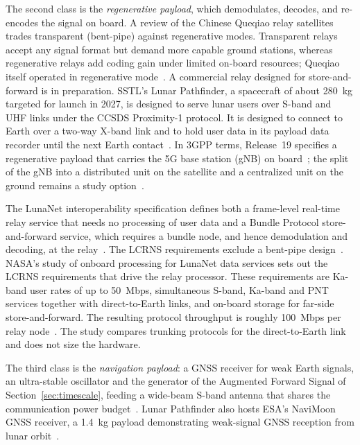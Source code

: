 \documentclass{IEEEoj}
\begin{document}
The second class is the \emph{regenerative payload}, which demodulates, decodes, and re-encodes the signal on board. A review of the Chinese Queqiao relay satellites trades transparent (bent-pipe) against regenerative modes. Transparent relays accept any signal format but demand more capable ground stations, whereas regenerative relays add coding gain under limited on-board resources; Queqiao itself operated in regenerative mode~\cite{queqiao_relay_review_2021}. A commercial relay designed for store-and-forward is in preparation. SSTL's Lunar Pathfinder, a spacecraft of about \SI{280}{kg} targeted for launch in 2027, is designed to serve lunar users over S-band and UHF links under the CCSDS Proximity-1 protocol. It is designed to connect to Earth over a two-way X-band link and to hold user data in its payload data recorder until the next Earth contact~\cite{davies_pathfinder_2023,sstl_pathfinder_guide,sstl_pathfinder_mission}. In 3GPP terms, Release~19 specifies a regenerative payload that carries the 5G base station (gNB) on board~\cite{3gpp_rel19_ntn}; the split of the gNB into a distributed unit on the satellite and a centralized unit on the ground remains a study option~\cite{3gpp_tr_38821}.

The LunaNet interoperability specification defines both a frame-level real-time relay service that needs no processing of user data and a Bundle Protocol store-and-forward service, which requires a bundle node, and hence demodulation and decoding, at the relay~\cite{lnis_v5}. The LCRNS requirements exclude a bent-pipe design~\cite{nasa_onboard_lunanet}. NASA's study of onboard processing for LunaNet data services sets out the LCRNS requirements that drive the relay processor. These requirements are Ka-band user rates of up to \SI{50}{Mbps}, simultaneous S-band, Ka-band and PNT services together with direct-to-Earth links, and on-board storage for far-side store-and-forward. The resulting protocol throughput is roughly \SI{100}{Mbps} per relay node~\cite{nasa_onboard_lunanet}. The study compares trunking protocols for the direct-to-Earth link and does not size the hardware.

The third class is the \emph{navigation payload}: a GNSS receiver for weak Earth signals, an ultra-stable oscillator and the generator of the Augmented Forward Signal of Section~\ref{sec:timescale}, feeding a wide-beam S-band antenna that shares the communication power budget~\cite{ansalone_lcrns_time}. Lunar Pathfinder also hosts ESA's NaviMoon GNSS receiver, a \SI{1.4}{kg} payload demonstrating weak-signal GNSS reception from lunar orbit~\cite{esa_navimoon}.
\end{document}
